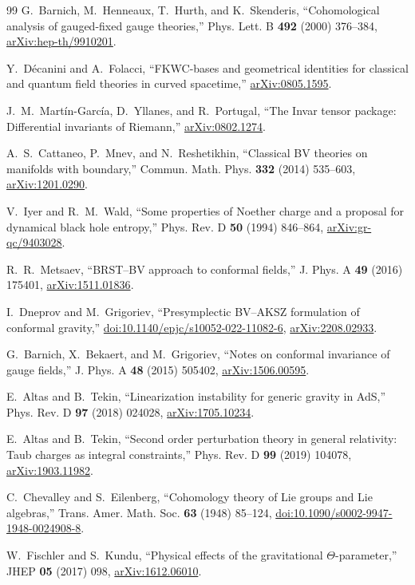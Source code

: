 \documentclass[11pt]{article}
\theoremstyle{definition}
\theoremstyle{remark}
\begin{document}
\begin{thebibliography}{99}
G.~Barnich, M.~Henneaux, T.~Hurth, and K.~Skenderis,
``Cohomological analysis of gauged-fixed gauge theories,''
Phys. Lett. B \textbf{492} (2000) 376--384,
\href{https://arxiv.org/abs/hep-th/9910201}{arXiv:hep-th/9910201}.

Y.~D\'ecanini and A.~Folacci,
``FKWC-bases and geometrical identities for classical and quantum field
theories in curved spacetime,''
\href{https://arxiv.org/abs/0805.1595}{arXiv:0805.1595}.

J.~M.~Mart\'in-Garc\'ia, D.~Yllanes, and R.~Portugal,
``The Invar tensor package: Differential invariants of Riemann,''
\href{https://arxiv.org/abs/0802.1274}{arXiv:0802.1274}.

A.~S.~Cattaneo, P.~Mnev, and N.~Reshetikhin,
``Classical BV theories on manifolds with boundary,''
Commun. Math. Phys. \textbf{332} (2014) 535--603,
\href{https://arxiv.org/abs/1201.0290}{arXiv:1201.0290}.

V.~Iyer and R.~M.~Wald,
``Some properties of Noether charge and a proposal for dynamical black hole
entropy,''
Phys. Rev. D \textbf{50} (1994) 846--864,
\href{https://arxiv.org/abs/gr-qc/9403028}{arXiv:gr-qc/9403028}.

R.~R.~Metsaev,
``BRST--BV approach to conformal fields,''
J. Phys. A \textbf{49} (2016) 175401,
\href{https://arxiv.org/abs/1511.01836}{arXiv:1511.01836}.

I.~Dneprov and M.~Grigoriev,
``Presymplectic BV--AKSZ formulation of conformal gravity,''
\href{https://doi.org/10.1140/epjc/s10052-022-11082-6}
{doi:10.1140/epjc/s10052-022-11082-6},
\href{https://arxiv.org/abs/2208.02933}{arXiv:2208.02933}.

G.~Barnich, X.~Bekaert, and M.~Grigoriev,
``Notes on conformal invariance of gauge fields,''
J. Phys. A \textbf{48} (2015) 505402,
\href{https://arxiv.org/abs/1506.00595}{arXiv:1506.00595}.

E.~Altas and B.~Tekin,
``Linearization instability for generic gravity in AdS,''
Phys. Rev. D \textbf{97} (2018) 024028,
\href{https://arxiv.org/abs/1705.10234}{arXiv:1705.10234}.

E.~Altas and B.~Tekin,
``Second order perturbation theory in general relativity: Taub charges as
integral constraints,''
Phys. Rev. D \textbf{99} (2019) 104078,
\href{https://arxiv.org/abs/1903.11982}{arXiv:1903.11982}.

C.~Chevalley and S.~Eilenberg,
``Cohomology theory of Lie groups and Lie algebras,''
Trans. Amer. Math. Soc. \textbf{63} (1948) 85--124,
\href{https://doi.org/10.1090/s0002-9947-1948-0024908-8}{doi:10.1090/s0002-9947-1948-0024908-8}.

W.~Fischler and S.~Kundu,
``Physical effects of the gravitational $\Theta$-parameter,''
JHEP \textbf{05} (2017) 098,
\href{https://arxiv.org/abs/1612.06010}{arXiv:1612.06010}.

\end{thebibliography}
\end{document}
